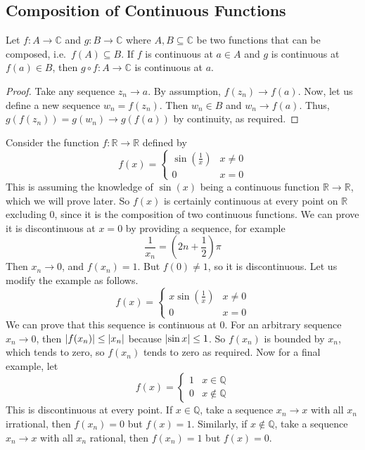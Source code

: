\subsection{Composition of Continuous Functions}
\begin{theorem}
	Let \(f \colon A \to \mathbb C\) and \(g \colon B \to \mathbb C\) where \(A, B \subseteq \mathbb C\) be two functions that can be composed, i.e.\ \(f(A) \subseteq B\). If \(f\) is continuous at \(a \in A\) and \(g\) is continuous at \(f(a) \in B\), then \(g \circ f \colon A \to \mathbb C\) is continuous at \(a\).
\end{theorem}
\begin{proof}
	Take any sequence \(z_n \to a\). By assumption, \(f(z_n) \to f(a)\). Now, let us define a new sequence \(w_n = f(z_n)\). Then \(w_n \in B\) and \(w_n \to f(a)\). Thus, \(g(f(z_n)) = g(w_n) \to g(f(a))\) by continuity, as required.
\end{proof}
\noindent Consider the function \(f\colon \mathbb R \to \mathbb R\) defined by
\[ f(x) = \begin{cases}
		\sin\left( \frac{1}{x} \right) & x \neq 0 \\
		0                              & x = 0
	\end{cases} \]
This is assuming the knowledge of \(\sin(x)\) being a continuous function \(\mathbb R\to \mathbb R\), which we will prove later. So \(f(x)\) is certainly continuous at every point on \(\mathbb R\) excluding 0, since it is the composition of two continuous functions. We can prove it is discontinuous at \(x=0\) by providing a sequence, for example
\[ \frac{1}{x_n} = \left(2n + \frac{1}{2}\right)\pi \]
Then \(x_n \to 0\), and \(f(x_n) = 1\). But \(f(0) \neq 1\), so it is discontinuous. Let us modify the example as follows.
\[ f(x) = \begin{cases}
		x\sin\left( \frac{1}{x} \right) & x \neq 0 \\
		0                               & x = 0
	\end{cases} \]
We can prove that this sequence is continuous at 0. For an arbitrary sequence \(x_n \to 0\), then \(\abs{f(x_n)} \leq \abs{x_n}\) because \(\abs{\sin x} \leq 1\). So \(f(x_n)\) is bounded by \(x_n\), which tends to zero, so \(f(x_n)\) tends to zero as required. Now for a final example, let
\[ f(x) = \begin{cases}
		1 & x \in \mathbb Q    \\
		0 & x \notin \mathbb Q
	\end{cases} \]
This is discontinuous at every point. If \(x \in \mathbb Q\), take a sequence \(x_n \to x\) with all \(x_n\) irrational, then \(f(x_n) = 0\) but \(f(x) = 1\). Similarly, if \(x \notin \mathbb Q\), take a sequence \(x_n \to x\) with all \(x_n\) rational, then \(f(x_n) = 1\) but \(f(x) = 0\).
